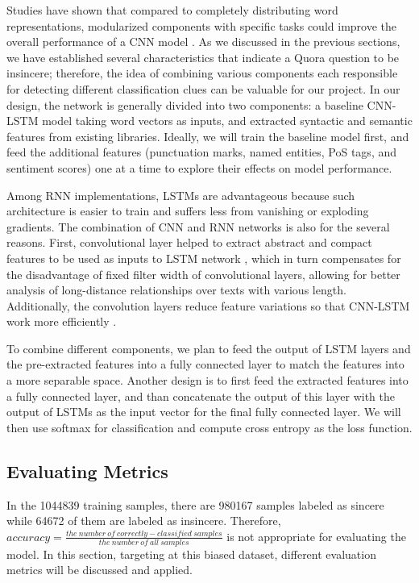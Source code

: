 \documentclass[12pt]{diazessay} %
\begin{document}
Studies have shown that compared to completely distributing word representations, modularized components with specific tasks could improve the overall performance of a CNN model \citep{poria2017}. As we discussed in the previous sections, we have established several characteristics that indicate a Quora question to be insincere; therefore, the idea of combining various components each responsible for detecting different classification clues can be valuable for our project. In our design, the network is generally divided into two components: a baseline CNN-LSTM model taking word vectors as inputs, and extracted syntactic and semantic features from existing libraries. Ideally, we will train the baseline model first, and feed the additional features (punctuation marks, named entities, PoS tags, and sentiment scores) one at a time to explore their effects on model performance. 

Among RNN implementations, LSTMs are advantageous because such architecture is easier to train and suffers less from vanishing or exploding gradients. The combination of CNN and RNN networks is also for the several reasons. First, convolutional layer helped to extract abstract and compact features to be used as inputs to LSTM network \citep{chan2015}, which in turn compensates for the disadvantage of fixed filter width of convolutional layers, allowing for better analysis of long-distance relationships over texts with various length. Additionally, the convolution layers reduce feature variations so that CNN-LSTM work more efficiently \citep{ghosh2016}.

To combine different components, we plan to feed the output of LSTM layers and the pre-extracted features into a fully connected layer to match the features into a more separable space. Another design is to first feed the extracted features into a fully connected layer, and than concatenate the output of this layer with the output of LSTMs as the input vector for the final fully connected layer. We will then use softmax for classification and compute cross entropy as the loss function. 



\subsection{Evaluating Metrics}

In the \num[group-separator={,}]{1044839} training samples, there are \num[group-separator={,}]{980167} samples labeled as sincere while \num[group-separator={,}]{64672} of them are labeled as insincere. Therefore, $accuracy = \frac{ the\ number\ of\ correctly-classified\ samples}{the\ number\ of\ all\ samples}$ is not appropriate for evaluating the model. In this section, targeting at this biased dataset, different evaluation metrics will be discussed and applied.
\end{document}
